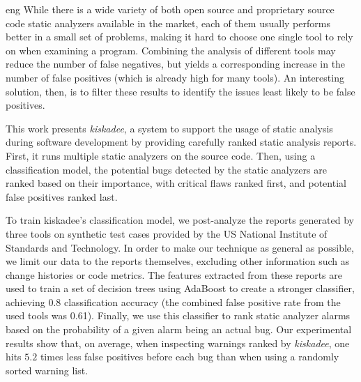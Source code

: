 \begin{resumo}{eng}
While there is a wide variety of both open source and proprietary source code
static analyzers available in the market, each of them usually performs
better in a small set of problems, making it hard to choose one single
tool to rely on when examining a program. Combining the analysis of
different tools may reduce the number of false negatives, but yields a
corresponding increase in the number of false positives (which is
already high for many tools). An interesting solution, then, is to
filter these results to identify the issues least likely to be false
positives.

This work presents \textit{kiskadee}, a system to support the usage of static
analysis during software development by providing carefully ranked static
analysis reports.  First, it runs multiple static analyzers on the source
code. Then, using a classification model, the potential bugs detected by the
static analyzers are ranked based on their importance, with critical flaws
ranked first, and potential false positives ranked last.

To train kiskadee's classification model, we post-analyze the reports generated
by three tools on synthetic test cases provided by the US National Institute
of Standards and Technology. In order to make our technique as general as
possible, we limit our data to the reports themselves, excluding other
information such as change histories or code metrics. The features extracted
from these reports are used to train a set of decision trees using AdaBoost
to create a stronger classifier, achieving 0.8 classification accuracy (the
combined false positive rate from the used tools was 0.61).  Finally, we use
this classifier to rank static analyzer alarms based on the probability of a
given alarm being an actual bug. Our experimental results show that, on
average, when inspecting warnings ranked by \textit{kiskadee}, one hits $5.2$
times less false positives before each bug than when using a randomly sorted
warning list.
\end{resumo}



